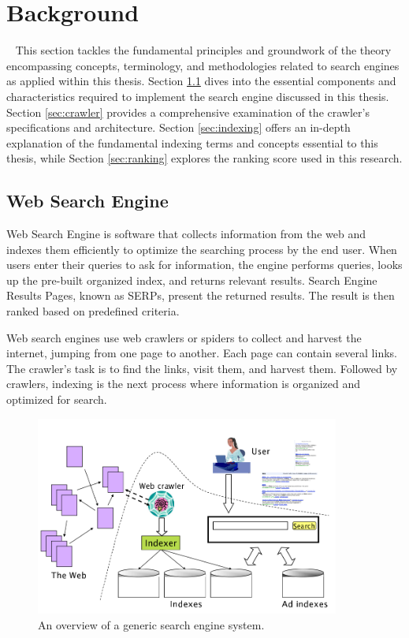 \chapter{Background}\
\label{chap:background}
This section tackles the fundamental principles and groundwork of the theory encompassing concepts, terminology, and methodologies related to search engines as applied within this thesis. Section \ref{sec:web-search-engine} dives into the essential components and characteristics required to implement the search engine discussed in this thesis. Section \ref{sec:crawler} provides a comprehensive examination of the crawler's specifications and architecture. Section \ref{sec:indexing} offers an in-depth explanation of the fundamental indexing terms and concepts essential to this thesis, while Section \ref{sec:ranking} explores the ranking score used in this research.


\section{Web Search Engine}
\label{sec:web-search-engine}
Web Search Engine is software that collects information from the web and indexes them efficiently to optimize the searching process by the end user. When users enter their queries to ask for information, the engine performs queries, looks up the pre-built organized index, and returns relevant results. Search Engine Results Pages, known as SERPs, present the returned results. The result is then ranked based on predefined criteria. 

Web search engines use web crawlers or spiders to collect and harvest the internet, jumping from one page to another. Each page can contain several links. The crawler's task is to find the links, visit them, and harvest them. Followed by crawlers, indexing is the next process where information is organized and optimized for search.

\begin{figure}[h]	
     \centering
         \includegraphics[width=10cm]{images/engine_components.png}
              \caption{An overview of a generic search engine system.}
     \label{fig:search-engine-overvoew}
\end{figure}

